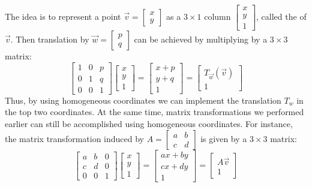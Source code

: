 \documentclass{ximera}
\begin{document}
The idea is to represent a point $\vec{v} = \left[
\begin{array}{r}
x\\
y
\end{array}
\right]$
    as a $3 \times 1$ column $\left[
    \begin{array}{r}
    x\\
    y\\
    1
    \end{array}
    \right]$, called the  of $\vec{v}$. Then translation by $\vec{w} = \left[
    \begin{array}{r}
    p\\
    q
    \end{array}
    \right]$ can be achieved by multiplying by a $3 \times 3$ matrix:
\begin{equation*}
\left[
\begin{array}{rrr}
1 & 0 & p\\
0 & 1 & q\\
0 & 0 & 1
\end{array}
\right] \left[
\begin{array}{r}
x\\
y\\
1
\end{array}
\right]
=
\left[
\begin{array}{c}
x + p\\
y + q\\
1
\end{array}
\right]
=
\left[
\begin{array}{c}
T_{\vec{w}}(\vec{v})\\
1
\end{array}
\right]
\end{equation*}
Thus, by using homogeneous coordinates we can implement the translation $T_{w}$ in the top two coordinates. At the same time, matrix transformations we performed earlier can still be accomplished using homogeneous coordinates.  For instance, the matrix transformation induced by $A = \left[
\begin{array}{rr}
a & b\\
c & d
\end{array}
\right]$ is given by a $3 \times 3$ matrix:
\begin{equation*}
\left[
\begin{array}{rrr}
a & b & 0\\
c & d & 0\\
0 & 0 & 1
\end{array}
\right] \left[
\begin{array}{r}
x\\
y\\
1
\end{array}
\right]
=
\left[
\begin{array}{c}
ax + by\\
cx + dy\\
1
\end{array}
\right]
=
\left[
\begin{array}{c}
A\vec{v}\\
1
\end{array}
\right]
\end{equation*}
\end{document}
